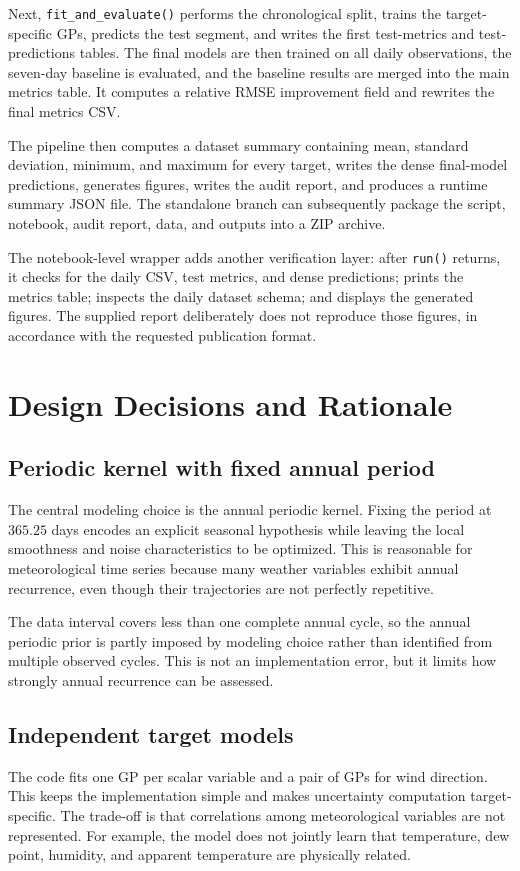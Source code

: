 \documentclass[11pt,a4paper]{article}
\newcommand{\code}[1]{\texttt{#1}}
\begin{document}
Next, \code{fit\_and\_evaluate()} performs the chronological split, trains the target-specific GPs, predicts the test segment, and writes the first test-metrics and test-predictions tables. The final models are then trained on all daily observations, the seven-day baseline is evaluated, and the baseline results are merged into the main metrics table. It computes a relative RMSE improvement field and rewrites the final metrics CSV.

The pipeline then computes a dataset summary containing mean, standard deviation, minimum, and maximum for every target, writes the dense final-model predictions, generates figures, writes the audit report, and produces a runtime summary JSON file. The standalone branch can subsequently package the script, notebook, audit report, data, and outputs into a ZIP archive.

The notebook-level wrapper adds another verification layer: after \code{run()} returns, it checks for the daily CSV, test metrics, and dense predictions; prints the metrics table; inspects the daily dataset schema; and displays the generated figures. The supplied report deliberately does not reproduce those figures, in accordance with the requested publication format.

\section{Design Decisions and Rationale}
\subsection{Periodic kernel with fixed annual period}
The central modeling choice is the annual periodic kernel. Fixing the period at $365.25$ days encodes an explicit seasonal hypothesis while leaving the local smoothness and noise characteristics to be optimized. This is reasonable for meteorological time series because many weather variables exhibit annual recurrence, even though their trajectories are not perfectly repetitive.

The data interval covers less than one complete annual cycle, so the annual periodic prior is partly imposed by modeling choice rather than identified from multiple observed cycles. This is not an implementation error, but it limits how strongly annual recurrence can be assessed.

\subsection{Independent target models}
The code fits one GP per scalar variable and a pair of GPs for wind direction. This keeps the implementation simple and makes uncertainty computation target-specific. The trade-off is that correlations among meteorological variables are not represented. For example, the model does not jointly learn that temperature, dew point, humidity, and apparent temperature are physically related.
\end{document}
